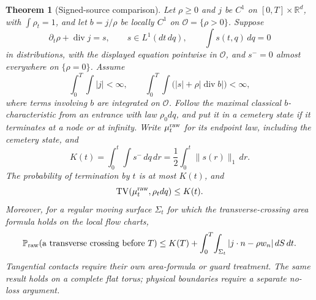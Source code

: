 \documentclass[11pt]{article}
\numberwithin{equation}{section}
\newtheorem{theorem}{Theorem}[section]
\theoremstyle{definition}
\theoremstyle{remark}
\begin{document}
\begin{theorem}[Signed-source comparison]\label{p3r:source-theorem}
Let $\rho\ge0$ and $j$ be $C^1$ on $[0,T]\times\mathbb R^d$, with $\int\rho_t=1$, and let $b=j/\rho$ be locally $C^1$ on $\mathcal O=\{\rho>0\}$. Suppose
\[
 \partial_t\rho+\operatorname{div}j=s,\qquad
 s\in L^1(dt\,dq),\qquad \int s(t,q)\,dq=0
\]
in distributions, with the displayed equation pointwise in $\mathcal O$, and $s^-=0$ almost everywhere on $\{\rho=0\}$. Assume
\begin{equation}\label{p3r:source-costs}
 \int_0^T\!\int |j|<\infty,\qquad
 \int_0^T\!\int\bigl(|s|+\rho|\operatorname{div}b|\bigr)<\infty,
\end{equation}
where terms involving $b$ are integrated on $\mathcal O$. Follow the maximal classical $b$-characteristic from an entrance with law $\rho_0dq$, and put it in a cemetery state if it terminates at a node or at infinity. Write $\mu_t^{\rm raw}$ for its endpoint law, including the cemetery state, and
\[
 K(t)=\int_0^t\!\int s^-\,dq\,dr
     =\frac12\int_0^t\|s(r)\|_1\,dr.
\]
The probability of termination by $t$ is at most $K(t)$, and
\begin{equation}\label{p3r:source-TV}
 \operatorname{TV}(\mu_t^{\rm raw},\rho_tdq)\le K(t).
\end{equation}
Moreover, for a regular moving surface $\Sigma_t$ for which the transverse-crossing area formula holds on the local flow charts,
\begin{equation}\label{p3r:source-crossing}
 \mathbb P_{\rm raw}(\text{a transverse crossing before }T)
 \le K(T)+\int_0^T\!\int_{\Sigma_t}
             |j\cdot n-\rho w_n|\,dS\,dt.
\end{equation}
Tangential contacts require their own area-formula or guard treatment. The same result holds on a complete flat torus; physical boundaries require a separate no-loss argument.
\end{theorem}
\end{document}
